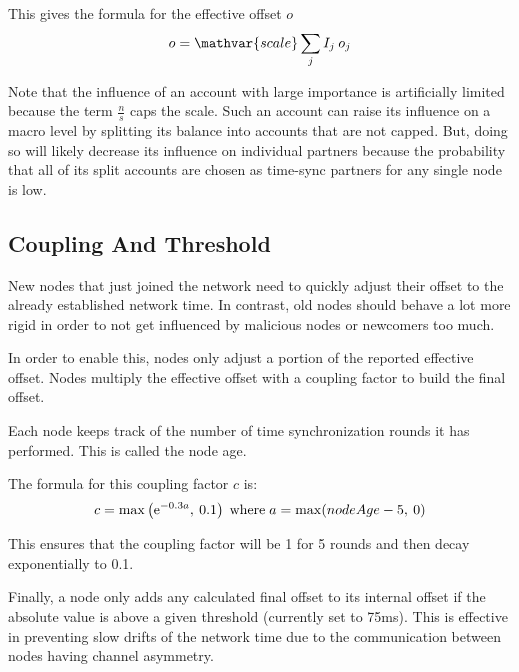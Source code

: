 This gives the formula for the effective offset $o$
$$ o = \mathvar{scale} \sum_j I_j \: o_j$$

Note that the influence of an account with large importance is artificially limited because the term $\frac{n}{s} $ caps the scale.
Such an account can raise its influence on a macro level by splitting its balance into accounts that are not capped.
But, doing so will likely decrease its influence on individual partners because the probability that all of its split accounts are chosen as time-sync partners for any single node is low.

\subsection{Coupling And Threshold}

New nodes that just joined the network need to quickly adjust their offset to the already established network time.
In contrast, old nodes should behave a lot more rigid in order to not get influenced by malicious nodes or newcomers too much.

In order to enable this, nodes only adjust a portion of the reported effective offset.
Nodes multiply the effective offset with a coupling factor to build the final offset.

Each node keeps track of the number of time synchronization rounds it has performed.
This is called the node age.

The formula for this coupling factor $c$ is:
$$c = \max\left(\mathrm{e}^{-0.3a},\: 0.1\right) \; \text{where} \; a = \max(nodeAge - 5,\: 0)$$

This ensures that the coupling factor will be 1 for 5 rounds and then decay exponentially to 0.1.

\begin{figure}
\end{figure}

Finally, a node only adds any calculated final offset to its internal offset if the absolute value is above a given threshold (currently set to 75ms).
This is effective in preventing slow drifts of the network time due to the communication between nodes having channel asymmetry.
